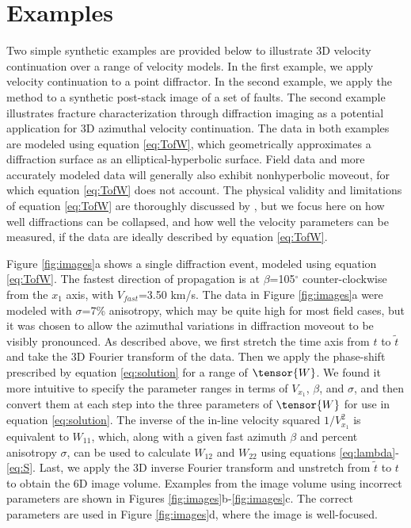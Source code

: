 \section{Examples}
Two simple synthetic examples are provided below to illustrate 3D velocity continuation over a range of velocity models.  
In the first example, we apply velocity continuation to a point diffractor.  
In the second example, we apply the method to a synthetic post-stack image of a set of faults.  
The second example illustrates fracture characterization through diffraction imaging as a potential application for 3D azimuthal velocity continuation.
The data in both examples are modeled using equation \ref{eq:TofW}, which geometrically approximates a diffraction surface as an elliptical-hyperbolic surface.
Field data and more accurately modeled data will generally also exhibit nonhyperbolic moveout, for which equation \ref{eq:TofW} does not account.
The physical validity and limitations of equation \ref{eq:TofW} are thoroughly discussed by \cite{GEO63-03-10791092}, but we focus here on how well diffractions can be collapsed, and how well the velocity parameters can be measured, if the data are ideally described by equation \ref{eq:TofW}. 


Figure \ref{fig:images}a shows a single diffraction event, modeled using equation \ref{eq:TofW}.  
The fastest direction of propagation is at $\beta $=105$^{\circ }$ counter-clockwise from the $x_1$ axis, with $V_{fast}$=3.50 km/s.  
The data in Figure \ref{fig:images}a were modeled with $\sigma $=7\% anisotropy, which may be quite high for most field cases, but it was chosen to allow the azimuthal variations in diffraction moveout to be visibly pronounced.  
As described above, we first stretch the time axis from $t$ to $\tilde{t}$ and take the 3D Fourier transform of the data.  
Then we apply the phase-shift prescribed by equation \ref{eq:solution} for a range of $\tensor{W}$.  
We found it more intuitive to specify the parameter ranges in terms of $V_{x_1}$, $\beta $, and $\sigma $, and then convert them at each step into the three parameters of $\tensor{W}$ for use in equation \ref{eq:solution}. 
The inverse of the in-line velocity squared $1/V_{x_1}^2$ is equivalent to $W_{11}$, which, along with a given fast azimuth $\beta $ and percent anisotropy $\sigma $, can be used to calculate $W_{12}$ and $W_{22}$ using equations \ref{eq:lambda}-\ref{eq:S}.
Last, we apply the 3D inverse Fourier transform and unstretch from $\tilde{t}$ to $t$ to obtain the 6D image volume.  
Examples from the image volume using incorrect parameters are shown in Figures \ref{fig:images}b-\ref{fig:images}c.  
The correct parameters are used in Figure \ref{fig:images}d, where the image is well-focused.

